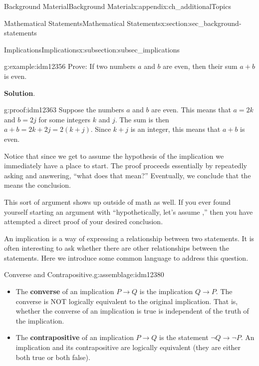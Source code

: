 \documentclass[oneside,10pt,]{book}
\newcommand{\terminology}[1]{\textbf{#1}}
\numberwithin{equation}{chapter}
\def\imp{\rightarrow}
\begin{document}
\begin{appendixptx}{Background Material}{}{Background Material}{}{}{x:appendix:ch_additionalTopics}
\begin{sectionptx}{Mathematical Statements}{}{Mathematical Statements}{}{}{x:section:sec_background-statements}
\begin{subsectionptx}{Implications}{}{Implications}{}{}{x:subsection:subsec_implications}
\begin{example}{}{g:example:idm12356}%
Prove: If two numbers \(a\) and \(b\) are even, then their sum \(a+b\) is even.%
\par\smallskip%
\noindent\textbf{Solution}.\hypertarget{g:solution:idm12362}{}\quad{}\begin{proofptx}{}{g:proof:idm12363}
Suppose the numbers \(a\) and \(b\) are even. This means that  \(a = 2k\) and \(b=2j\) for some integers \(k\) and \(j\). The sum is then \(a+b = 2k+2j = 2(k+j)\). Since \(k+j\) is an integer, this means that \(a+b\) is even.%
\end{proofptx}
Notice that since we get to assume the hypothesis of the implication we immediately have a place to start. The proof proceeds essentially by repeatedly asking and answering, ``what does that mean?''  Eventually, we conclude that the means the conclusion.%
\end{example}
This sort of argument shows up outside of math as well. If you ever found yourself starting an argument with ``hypothetically, let's assume \textellipsis{},'' then you have attempted a direct proof of your desired conclusion.%
\par
An implication is a way of expressing a relationship between two statements.  It is often interesting to ask whether there are other relationships between the statements.  Here we introduce some common language to address this question.%
\begin{assemblage}{Converse and Contrapositive.}{g:assemblage:idm12380}%
%
\begin{itemize}[label=\textbullet]
\item{}The \terminology{converse}  of an implication \(P \imp Q\) is the implication \(Q \imp P\). The converse is NOT logically equivalent to the original implication.  That is, whether the converse of an implication is true is independent of the truth of the implication.%
\item{}The \terminology{contrapositive}  of an implication \(P \imp Q\) is the statement \(\neg Q \imp \neg P\). An implication and its contrapositive are logically equivalent (they are either both true or both false).%
\end{itemize}
%
\end{assemblage}

\end{subsectionptx}
\end{sectionptx}
\end{appendixptx}
\end{document}

